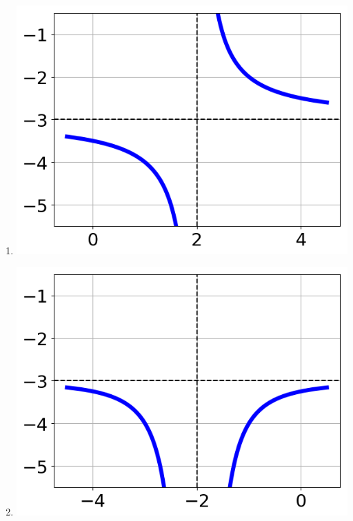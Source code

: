 \documentclass{article}[10pt]
\begin{document}
\begin{enumerate}[label=\Alph*.]
\item  
\begin{center}\includegraphics[scale=0.5]{../Figures/question35BD.png}\end{center} 
 
\item  
\begin{center}\includegraphics[scale=0.5]{../Figures/question35BA.png}\end{center} 
 

\end{enumerate}
\end{document}
